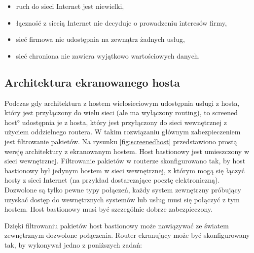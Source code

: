 \begin{itemize}

\item ruch do sieci Internet jest niewielki,

\item łączność z siecią Internet nie decyduje o prowadzeniu interesów firmy,

\item sieć firmowa nie udostępnia na zewnątrz żadnych usług,

\item sieć chroniona nie zawiera wyjątkowo wartościowych danych.

\end{itemize}

\subsection{Architektura ekranowanego hosta}

Podczas gdy architektura z hostem wielosieciowym udostępnia usługi z hosta,
który jest przyłączony do wielu sieci (ale ma wyłączony routing), to
 \ang{screened host} udostępnia je z
hosta, który jest przyłączony do sieci wewnętrznej z użyciem oddzielnego
routera. W takim rozwiązaniu głównym zabezpieczeniem jest filtrowanie
pakietów. Na rysunku \ref{fig:screenedhost} przedstawiono prostą wersję
architektury z ekranowanym hostem. Host bastionowy jest umieszczony w sieci
wewnętrznej. Filtrowanie pakietów w routerze skonfigurowano tak, by host
bastionowy był jedynym hostem w sieci wewnętrznej, z którym mogą się łączyć
hosty z sieci Internet (na przykład dostarczające pocztę elektroniczną).
Dozwolone są tylko pewne typy połączeń, każdy system zewnętrzny próbujący
uzyskać dostęp do wewnętrznych systemów lub usług musi się połączyć z tym
hostem. Host bastionowy musi być szczególnie dobrze zabezpieczony.

\begin{figure*}
\begin{center}

\end{center}
\caption[Architektura z ekranowanym hostem]
{\label{fig:screenedhost} Architektura z ekranowanym hostem.}
\end{figure*}

Dzięki filtrowaniu pakietów host bastionowy może nawiązywać ze światem
zewnętrznym dozwolone połączenia. Router ekranujący może być skonfigurowany
tak, by wykonywał jedno z poniższych zadań:

